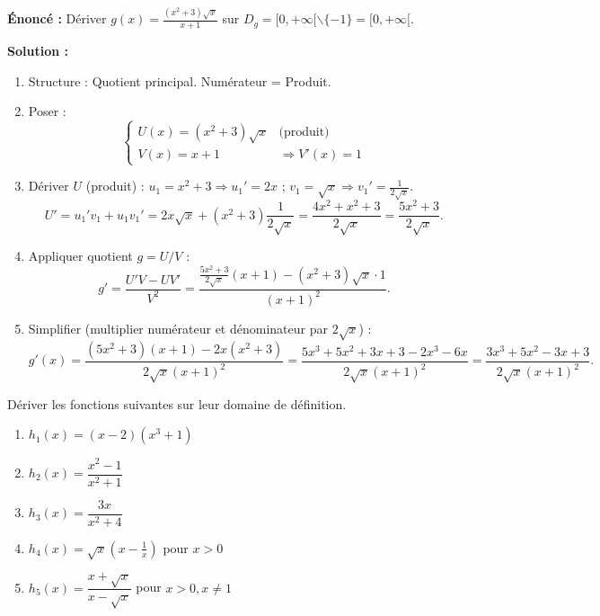 \documentclass[11pt]{article}
\def\setminus{\mathbin{\backslash}}\let\smallsetminus\setminus
\begin{document}
\begin{exoresolu}
\textbf{Énoncé :} Dériver $g(x) = \frac{(x^2+3)\sqrt{x}}{x+1}$ sur $D_g = [0,+\infty[\setminus\{-1\} = [0,+\infty[$.

\textbf{Solution :}
\begin{enumerate}
    \item Structure : Quotient principal. Numérateur = Produit.
    \item Poser :
    \[
    \begin{cases}
    U(x) = (x^2+3)\sqrt{x} & \text{(produit)} \\
    V(x) = x+1 & \Rightarrow V'(x)=1
    \end{cases}
    \]
    \item Dériver $U$ (produit) : $u_1=x^2+3 \Rightarrow u_1'=2x$ ; $v_1=\sqrt{x} \Rightarrow v_1'=\frac{1}{2\sqrt{x}}$.
    \[
    U' = u_1'v_1 + u_1v_1' = 2x\sqrt{x} + (x^2+3)\frac{1}{2\sqrt{x}} = \frac{4x^2 + x^2 + 3}{2\sqrt{x}} = \frac{5x^2+3}{2\sqrt{x}}.
    \]
    \item Appliquer quotient $g = U/V$ :
    \[
    g' = \frac{U'V - UV'}{V^2} = \frac{\frac{5x^2+3}{2\sqrt{x}}(x+1) - (x^2+3)\sqrt{x}\cdot 1}{(x+1)^2}.
    \]
    \item Simplifier (multiplier numérateur et dénominateur par $2\sqrt{x}$) :
    \[
    g'(x) = \frac{(5x^2+3)(x+1) - 2x(x^2+3)}{2\sqrt{x}(x+1)^2} = \frac{5x^3+5x^2+3x+3 - 2x^3-6x}{2\sqrt{x}(x+1)^2} = \frac{3x^3+5x^2-3x+3}{2\sqrt{x}(x+1)^2}.
    \]
\end{enumerate}
\end{exoresolu}

\begin{exercice}
Dériver les fonctions suivantes sur leur domaine de définition.
\begin{enumerate}
    \item $h_1(x) = (x-2)(x^3+1)$
    \item $h_2(x) = \dfrac{x^2-1}{x^2+1}$
    \item $h_3(x) = \dfrac{3x}{x^2+4}$
    \item $h_4(x) = \sqrt{x}(x - \frac{1}{x})$ pour $x>0$
    \item $h_5(x) = \dfrac{x+\sqrt{x}}{x-\sqrt{x}}$ pour $x>0, x\neq 1$
\end{enumerate}
\end{exercice}
\end{document}
